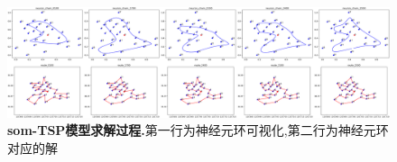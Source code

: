 \begin{figure}[h]
    \begin{center}
        \includegraphics[width=1.0\linewidth]{fig/iteration}
    \end{center}
    \caption{\textbf{som-TSP模型求解过程.}第一行为神经元环可视化,第二行为神经元环对应的解} 
        \label{fig:iteration}
  \end{figure}